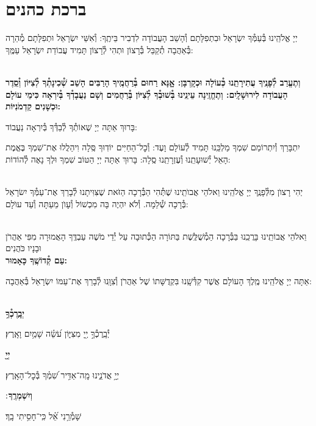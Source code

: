 \documentclass[twoside, openany, parskip=half, 11pt]{book}
\begin{document}
\sepline

\clearpage

\vspace{-1\baselineskip}
\section[ברכת כהנים]{ ברכת כהנים ‎}
\label{birkaskohanim}

יְיָ אֱלֹהֵֽינוּ בְּ֯עַמְּ֯ךָ יִשְׂרָאֵל וּבִתְפִלָּתָם וְ֯הָשֵׁב הָעֲבוֹדָה לִדְבִיר בֵּיתֶֽךָ: וְ֯אִשֵּׁי יִשְׂרָאֵל וּתְפִלָּתָם מְ֯הֵרָה בְּ֯אַהֲבָה תְ֯קַבֵּל בְּ֯רָצוֹן וּתְהִי לְ֯רָצוֹן תָּמִיד עֲבוֹדַת יִשְׂרָאֵל עַמֶּֽךָ:

\chazzanvkahal \\
\textbf{
וְתֶעֱרַב לְ֯פָנֶֽיךָ עֲתִירָתֵֽנוּ כְּ֯עוֹלָה וּכְקָרְבָּן:
אׇׇנָּא רַחוּם בְּ֯רַחֲמֶֽיךָ הָרַבִּים הָשֵׁב שְׁ֯כִינָתְ֯ךָ לְ֯צִיּוֹן וְ֯סֵֽדֶר הָעֲבוֹדָה לִירוּשָׁלָֽיִם:
וְתֶחֱזֶֽינָה עֵינֵֽינוּ בְּ֯שׁוּבְ֯ךָ לְ֯צִיּוֹן בְּ֯רַחֲמִים
וְשָׁם נַעֲבָדְ֯ךָ בְּ֯יִרְאָה כִּימֵי עוֹלָם וּכְשָׁנִים קַדְמֹנִיּוֹת:
}

\chazzan
בָּרוּךְ אַתָּה יְיָ שֶׁאוֹתְ֯ךָ לְ֯בַדְּ֯ךָ בְּ֯יִרְאָה נַעֲבוֹד:

\modim

יִתְבָּרַךְ וְ֯יִתְרוֹמַם שִׁמְךָ מַלְכֵּֽנוּ תָּמִיד לְ֯עוֹלָם וָעֶד: וְ֯כׇל־הַחַיִּים יוֹדֽוּךָ סֶּֽלָה וִיהַלֲלוּ אֶת־שִׁמְךָ בֶּאֱמֶת הָאֵל יְ֯שׁוּעָתֵֽנוּ וְ֯עֶזְרָתֵֽנוּ סֶֽלָה: בָּרוּךְ אַתָּה יְיָ הַטּוֹב שִׁמְךָ וּלְךָ נָאֶה לְ֯הוֹדוֹת:

\\
יְהִי רָצוׂן מִלְּ֯פָנֶֽךָ יְיָ אֱלֹהֵֽינוּ וֵאלֹהֵי אֲבוׂתֵֽינוּ שֶׁתְּ֯הִי הַבְּ֯רָכָה הַזֹּאת שֶׁצִּוִּיתָנוּ לְ֯בָרֵךְ אֶת־עַמְּ֯ךָ יִשׂרָאֵל בְּ֯רָכָה שְׁ֯לֵמָה. וְ֯לֹא יִהְיֶה בָּה מִכְשׁוֹל וְ֯עָוׂן מֵעַתָּה וְ֯עַד עוׂלָם:

\\
\shatz {}
וֵאלֹהֵי אֲבוֹתֵֽינוּ בָּרֲכֵֽנוּ בַּבְּ֯רָכָה הַמְ֯שֻׁלֶּֽשֶׁת בַּתּוֹרָה הַכְּ֯תוּבָה עַל יְ֯דֵי מֹשֶׁה עַבְדֶּֽךָ הָאֲמוּרָה מִפִּי אַהֲרֹן וּבָנָיו כֹּהֲנִים \\
\shatzvkahal
\textbf{עַם קְ֯דוֹשֶֽׁךָ כָּאָמוּר:}

אַתָּה יְיָ אֱלֹהֵֽינוּ מֶֽלֶךְ הָעוֹלָם אֲשֶׁר קִדְּ֯שָֽׁנוּ בִּקְדֻשָּׁתוֹ שֶׁל אַהֲרֹן וְ֯צִוָּֽנוּ לְ֯בָרֵךְ אֶת־עַמּוֹ יִשְׂרָאֵל בְּ֯אַהֲבָה:


\\
\textbf{יְבָֽרֶכְ֯ךָ֥}
\hfill \begin{footnotesize}
 יְ֯בָֽרֶכְ֯ךָ֣ יְ֖יָ מִצִּיּ֑וֹן עֹ֝שֵׂ֗ה שָׁמַ֥יִם וָאָֽרֶץ׃\\
\end{footnotesize}
\textbf{יְיָ֖}
\hfill \begin{footnotesize}
 יְיָ֥ אֲדֹנֵ֑ינוּ מָֽה־אַדִּ֥יר שִׁ֝מְ֗ךָ בְּ֯כׇל־הָאָֽרֶץ׃\\
\end{footnotesize}
\textbf{וְיִשְׁמְרֶֽךָ}
׃ \hfill \begin{footnotesize}
 שָׁמְ֯רֵ֥נִי אֵ֝֗ל כִּֽי־חָסִ֥יתִי בָֽךְ׃
\end{footnotesize}
\end{document}
